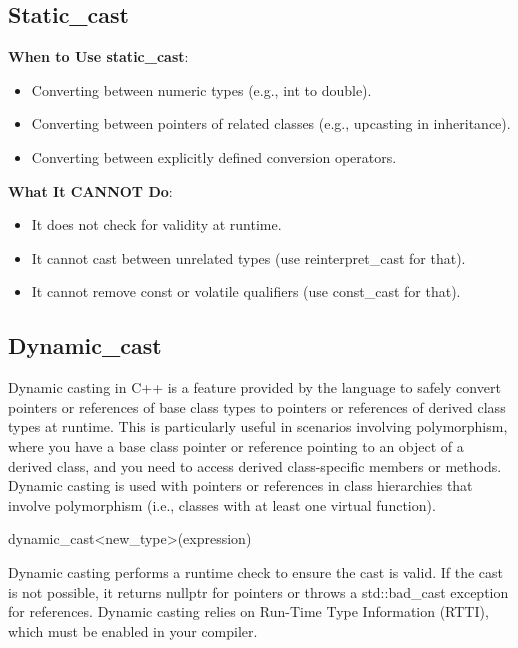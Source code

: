 \documentclass{report}
\begin{document}
    \subsection{Static\_cast}
    \bigbreak \noindent 
    \textbf{When to Use static\_cast}:
    \bigbreak \noindent 
    \begin{itemize}
        \item Converting between numeric types (e.g., int to double).
        \item Converting between pointers of related classes (e.g., upcasting in inheritance).
        \item Converting between explicitly defined conversion operators.
    \end{itemize}
    \bigbreak \noindent 
    \textbf{What It CANNOT Do}:
    \begin{itemize}
        \item It does not check for validity at runtime.
        \item It cannot cast between unrelated types (use reinterpret\_cast for that).
        \item It cannot remove const or volatile qualifiers (use const\_cast for that).
    \end{itemize}
    \bigbreak \noindent 
    \subsection{Dynamic\_cast}
    \bigbreak \noindent 
    Dynamic casting in C++ is a feature provided by the language to safely convert pointers or references of base class types to pointers or references of derived class types at runtime. This is particularly useful in scenarios involving polymorphism, where you have a base class pointer or reference pointing to an object of a derived class, and you need to access derived class-specific members or methods.
    \bigbreak \noindent 
    Dynamic casting is used with pointers or references in class hierarchies that involve polymorphism (i.e., classes with at least one virtual function).
    \bigbreak \noindent 
    \begin{cppcode}
    dynamic_cast<new_type>(expression)
    \end{cppcode}
    \bigbreak \noindent 
    Dynamic casting performs a runtime check to ensure the cast is valid. If the cast is not possible, it returns nullptr for pointers or throws a std::bad\_cast exception for references.
    \bigbreak \noindent 
    Dynamic casting relies on Run-Time Type Information (RTTI), which must be enabled in your compiler.
    \bigbreak \noindent 
\end{document}
